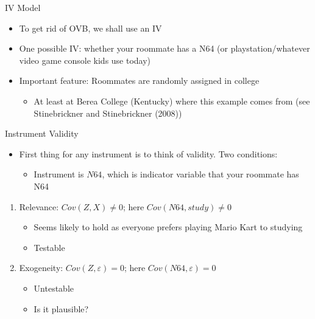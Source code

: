 \documentclass[aspectratio=169,11pt]{beamer}
\begin{document}
\begin{frame}{IV Model}
\begin{itemize}
\item To get rid of OVB, we shall use an IV
\medskip
\item One possible IV: whether your roommate has a N64 (or playstation/whatever video game console kids use today)
\medskip
\item Important feature: Roommates are randomly assigned in college
\begin{itemize}
\item At least at Berea College (Kentucky) where this example comes from (see Stinebrickner and Stinebrickner (2008))
\end{itemize}
\end{itemize}
\end{frame}

\begin{frame}{Instrument Validity}
\begin{itemize}
\item First thing for any instrument is to think of validity. Two conditions:
\begin{itemize}
\item Instrument is $N64$, which is indicator variable that your roommate has N64
\end{itemize}
\end{itemize}
\begin{enumerate}
\item Relevance: $Cov(Z,X)\neq 0$; here $Cov(N64,study)\neq 0$
\begin{itemize}
\item Seems likely to hold as everyone prefers playing Mario Kart to studying
\item Testable
\end{itemize}
\medskip
\item Exogeneity: $Cov(Z,\varepsilon)= 0$; here $Cov(N64,\varepsilon)=0$
\begin{itemize}
\item Untestable
\item Is it plausible? 
\end{itemize}
\end{enumerate}
\end{frame}
\end{document}
